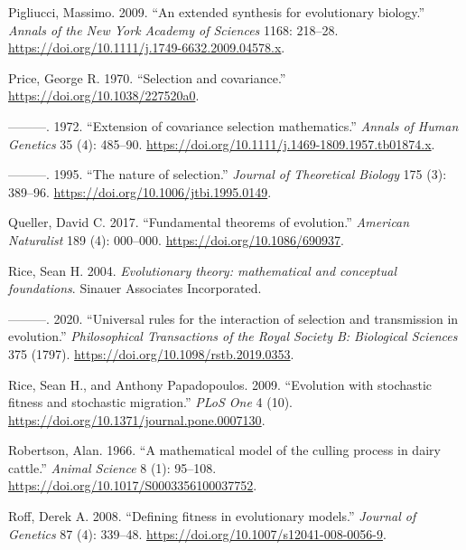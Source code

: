 \documentclass[
]{article}
\newlength{\cslhangindent}
\newlength{\cslentryspacingunit} %
\newenvironment{CSLReferences}[2] %
 {%
  \setlength{\parindent}{0pt}
  \ifodd #1
  \let\oldpar\par
  \def\par{\hangindent=\cslhangindent\oldpar}
  \fi
  \setlength{\parskip}{#2\cslentryspacingunit}
 }%
 {}
\begin{document}
\begin{CSLReferences}{1}{0}
\leavevmode{}%
Pigliucci, Massimo. 2009. {``{An extended synthesis for evolutionary
biology}.''} \emph{Annals of the New York Academy of Sciences} 1168:
218--28. \url{https://doi.org/10.1111/j.1749-6632.2009.04578.x}.

\leavevmode{}%
Price, George R. 1970. {``{Selection and covariance}.''}
\url{https://doi.org/10.1038/227520a0}.

\leavevmode{}%
---------. 1972. {``{Extension of covariance selection mathematics}.''}
\emph{Annals of Human Genetics} 35 (4): 485--90.
\url{https://doi.org/10.1111/j.1469-1809.1957.tb01874.x}.

\leavevmode{}%
---------. 1995. {``{The nature of selection}.''} \emph{Journal of
Theoretical Biology} 175 (3): 389--96.
\url{https://doi.org/10.1006/jtbi.1995.0149}.

\leavevmode{}%
Queller, David C. 2017. {``{Fundamental theorems of evolution}.''}
\emph{American Naturalist} 189 (4): 000--000.
\url{https://doi.org/10.1086/690937}.

\leavevmode{}%
Rice, Sean H. 2004. \emph{{Evolutionary theory: mathematical and
conceptual foundations}}. Sinauer Associates Incorporated.

\leavevmode{}%
---------. 2020. {``{Universal rules for the interaction of selection
and transmission in evolution}.''} \emph{Philosophical Transactions of
the Royal Society B: Biological Sciences} 375 (1797).
\url{https://doi.org/10.1098/rstb.2019.0353}.

\leavevmode{}%
Rice, Sean H., and Anthony Papadopoulos. 2009. {``{Evolution with
stochastic fitness and stochastic migration}.''} \emph{PLoS One} 4 (10).
\url{https://doi.org/10.1371/journal.pone.0007130}.

\leavevmode{}%
Robertson, Alan. 1966. {``{A mathematical model of the culling process
in dairy cattle}.''} \emph{Animal Science} 8 (1): 95--108.
\url{https://doi.org/10.1017/S0003356100037752}.

\leavevmode{}%
Roff, Derek A. 2008. {``{Defining fitness in evolutionary models}.''}
\emph{Journal of Genetics} 87 (4): 339--48.
\url{https://doi.org/10.1007/s12041-008-0056-9}.


\end{CSLReferences}
\end{document}
